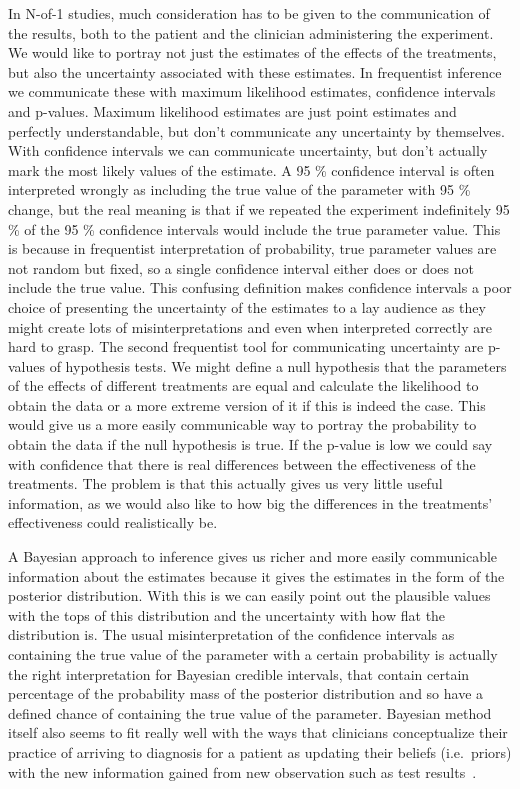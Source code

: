 \documentclass[12pt,a4paper,leqno]{report}
\theoremstyle{plain}
\theoremstyle{definition}
\theoremstyle{remark}
\begin{document}
In N-of-1 studies, much consideration has to be given to the communication of the
results, both to the patient and the clinician administering the experiment. We
would like to portray not just the estimates of the effects of the treatments,
but also the uncertainty associated with these estimates. In frequentist
inference we communicate these with maximum likelihood estimates, confidence
intervals and p-values. Maximum likelihood estimates are just point estimates and perfectly
understandable, but don't communicate any uncertainty by themselves. With confidence
intervals we can communicate uncertainty, but don't actually mark the most likely
values of the estimate. A 95 \% confidence interval is often interpreted wrongly
as including the true value of the parameter with 95 \% change, but the real
meaning is that if we repeated the experiment indefinitely 95 \% of the
95 \% confidence intervals would include the true parameter value. This is
because in frequentist interpretation of probability, true parameter values
are not random but fixed, so a single confidence interval either does or does
not include the true value. This confusing definition makes confidence intervals
a poor choice of presenting the uncertainty of the estimates to a lay audience
as they might create lots of misinterpretations and even when interpreted correctly
are hard to grasp. The second frequentist tool for communicating uncertainty
are p-values of hypothesis tests. We might define a null hypothesis that the
parameters of the effects of different treatments are equal and calculate the
likelihood to obtain the data or a more extreme version of it if this is indeed the
case. This would give us a more easily communicable way to portray the probability
to obtain the data if the null hypothesis is true. If the p-value is low we could
say with confidence that there is real differences between the effectiveness of
the treatments. The problem is that this actually gives us very little useful
information, as we would also like to how big the differences in the treatments' effectiveness
could realistically be.

A Bayesian approach to inference gives us richer and more easily communicable
information about the estimates because it gives the estimates in the form of the
posterior distribution. With this is we can easily point out the plausible values
with the tops of this distribution and the uncertainty with how flat the
distribution is. The usual misinterpretation of the confidence intervals as
containing the true value of the parameter with a certain probability is actually
the right interpretation for Bayesian credible intervals, that contain certain
percentage of the probability mass of the posterior distribution and so have a
defined chance of containing the true value of the parameter. Bayesian method itself
also seems to fit really well with the ways that clinicians conceptualize
their practice of arriving to  diagnosis for a patient as updating their beliefs
(i.e.\ priors) with the new information gained from new observation such as test
results\ \cite{clinbayes}.
\end{document}
